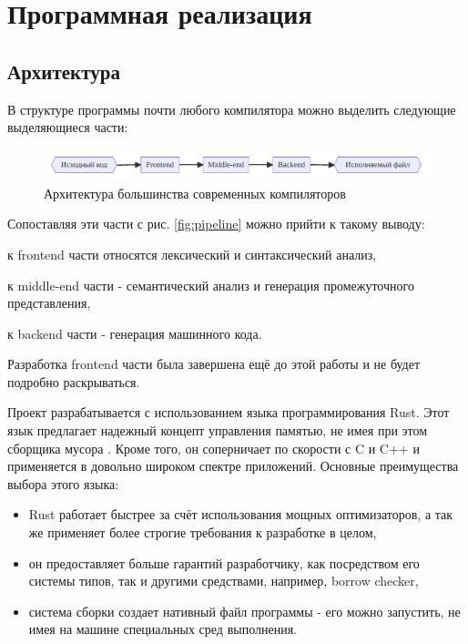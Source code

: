 \chapter{Программная реализация}
\label{ch:chap3_soft_architecture}
\section{Архитектура}
\label{sec:architecture}

В структуре программы почти любого компилятора можно выделить следующие выделяющиеся части:

\begin{figure}[H]
    \centering
    \includegraphics[width=\textwidth]{figures/arch}
    \caption{Архитектура большинства современных компиляторов}
    \label{fig:arch}
\end{figure}

Сопоставляя эти части с рис. \ref{fig:pipeline} можно прийти к такому выводу:
\begin{inparaenum}[1)]
    \item к frontend части относятся лексический и синтаксический анализ,
    \item к middle-end части - семантический анализ и генерация промежуточного представления,
    \item к backend части - генерация машинного кода.
\end{inparaenum}
Разработка frontend части была завершена ещё до этой работы и не будет подробно раскрываться.

Проект разрабатывается с использованием языка программирования Rust.
Этот язык предлагает надежный концепт управления памятью, не имея при этом сборщика мусора \cite{RustMemory}.
Кроме того, он соперничает по скорости с C и C++ и применяется в довольно широком спектре приложений.
Основные преимущества выбора этого языка:
\begin{itemize}
    \item Rust работает быстрее за счёт использования мощных оптимизаторов, а так же применяет более строгие требования к разработке в целом,
    \item он предоставляет больше гарантий разработчику, как посредством его системы типов, так и другими средствами, например, borrow checker,
    \item система сборки создает нативный файл программы - его можно запустить, не имея на машине специальных сред выполнения.
\end{itemize}

